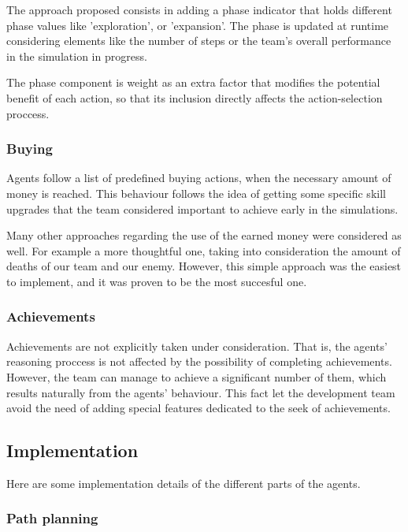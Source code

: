 \documentclass{llncs2e/llncs}
\begin{document}
    The approach proposed consists in adding a phase indicator that holds different 
    phase values like 'exploration', or 'expansion'. The phase is updated at runtime
    considering elements like the number of steps or the team's overall performance 
    in the simulation in progress.
    
    The phase component is weight as an extra factor that modifies the potential 
    benefit of each action, so that its inclusion directly affects the action-selection 
    proccess.
    
\subsubsection{Buying}

    Agents follow a list of predefined buying actions, when the necessary amount 
    of money is reached. This behaviour follows the idea of getting some specific skill 
    upgrades that the team considered important to achieve early in the simulations.
    
    Many other approaches regarding the use of the earned money were considered as well.
    For example a more thoughtful one, taking into consideration the amount of deaths 
    of our team and our enemy. However, this simple approach was the easiest to implement, 
    and it was proven to be the most succesful one.

\subsubsection{Achievements}

    Achievements are not explicitly taken under consideration. That is, the agents'
    reasoning proccess is not affected by the possibility of completing achievements.    
    However, the team can manage to achieve a significant number of them, which 
    results naturally from the agents' behaviour. 
    This fact let the development team avoid the need of adding special features 
    dedicated to the seek of achievements.
    
\subsection{Implementation}

    Here are some implementation details of the different parts of the agents.
    
\subsubsection{Path planning}
\end{document}
